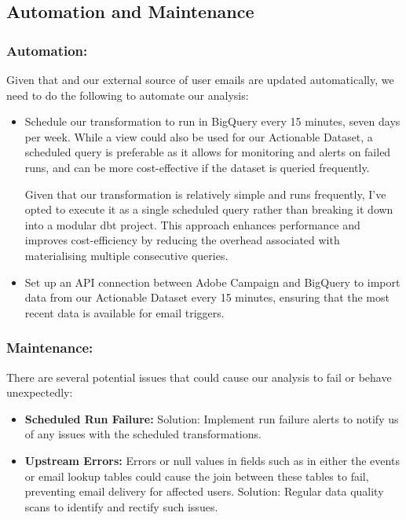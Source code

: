 \documentclass[a4paper,11pt,leqno,openbib,oldfontcommands,oneside]{memoir}
\begin{document}
\subsection{Automation and Maintenance}

\subsubsection{Automation:} Given that  and our external source of user emails are updated automatically, we need to do the following to automate our analysis:

\begin{itemize}
    \item Schedule our transformation to run in BigQuery every 15 minutes, seven days per week. While a view could also be used for our Actionable Dataset, a scheduled query is preferable as it allows for monitoring and alerts on failed runs, and can be more cost-effective if the dataset is queried frequently.
    \vspace{3pt}
    \begin{center}
        \begin{tcolorbox}[sidenote]
            Given that our transformation is relatively simple and runs frequently, I've opted to execute it as a single scheduled query rather than breaking it down into a modular dbt project. This approach enhances performance and improves cost-efficiency by reducing the overhead associated with materialising multiple consecutive queries.
        \end{tcolorbox}
    \vspace{3pt}    
\end{center}
    \item Set up an API connection between Adobe Campaign and BigQuery to import data from our Actionable Dataset every 15 minutes, ensuring that the most recent data is available for email triggers.
\end{itemize}

\subsubsection{Maintenance:} There are several potential issues that could cause our analysis to fail or behave unexpectedly:

\begin{itemize}
    \item \textbf{Scheduled Run Failure:} Solution: Implement run failure alerts to notify us of any issues with the scheduled transformations.
    \item \textbf{Upstream Errors:} Errors or null values in fields such as  in either the events or email lookup tables could cause the join between these tables to fail, preventing email delivery for affected users. Solution: Regular data quality scans to identify and rectify such issues.
\end{itemize}
\end{document}
